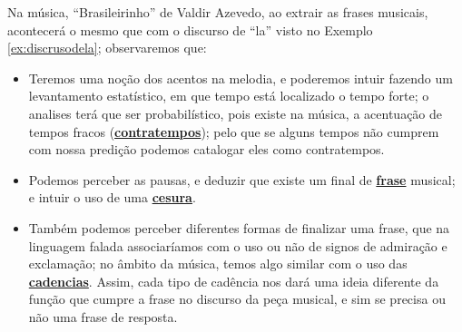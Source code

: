 \begin{example}
Na música, ``Brasileirinho''  de Valdir Azevedo, 
ao extrair as frases musicais, 
acontecerá o mesmo que com o discurso de ``la'' visto no Exemplo \ref{ex:discrusodela};
observaremos que:
\begin{itemize}
\item Teremos uma noção dos acentos na melodia, e poderemos intuir fazendo um levantamento estatístico,
em que tempo está localizado o tempo forte; o analises terá que ser probabilístico,
pois existe na música, a acentuação de tempos fracos (\hyperref[fig:contratempo]{\textbf{contratempos}}); 
pelo que se alguns tempos não cumprem com nossa predição podemos catalogar eles como contratempos.
\item Podemos perceber as pausas, e deduzir que existe um final de \hyperref[fig:Frase]{\textbf{frase}} musical;
e intuir o uso de uma \hyperref[fig:Cesura]{\textbf{cesura}}.
\item Também podemos perceber diferentes formas de finalizar uma frase, 
que na linguagem falada associaríamos com o uso ou não de signos de admiração e exclamação;
no âmbito da música, temos algo similar com o uso das \hyperref[fig:Cadencia]{\textbf{cadencias}}.
Assim, cada tipo de cadência nos dará uma ideia diferente da função que cumpre a frase no discurso da peça musical,
e sim se precisa ou não uma frase de resposta.
\end{itemize}
\end{example}
